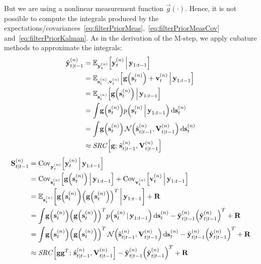 		But we are using a nonlinear measurement function \( \vec{g}(\cdot) \). Hence, it is not possible to compute the integrals produced by the expectations/covariances~\eqref{eq:filterPriorMeas},~\eqref{eq:filterPriorMeasCov} and~\eqref{eq:filterPriorKalman}. As in the derivation of the M-step, we apply cubature methods to approximate the integrals:
		\begin{align}
			\hat{\boldsymbol{\mathrm{y}}}_{t \vert t - 1}^{(n)}
				&= \mathbb{E}_{\boldsymbol{\mathrm{y}}_t^{(n)}}\Big[\boldsymbol{\mathrm{y}}_t^{(n)} \,\Big\vert\, \boldsymbol{\mathrm{y}}_{1:t - 1}\Big]  \nonumber \\
				&= \mathbb{E}_{\boldsymbol{\mathrm{s}}_t^{(n)}, \boldsymbol{\mathrm{v}}_t^{(n)}}\Big[\boldsymbol{\mathrm{g}}\Big(\boldsymbol{\mathrm{s}}_t^{(n)}\Big) + \boldsymbol{\mathrm{v}}_t^{(n)} \,\Big\vert\, \boldsymbol{\mathrm{y}}_{1:t - 1}\Big]  \nonumber \\
				&= \mathbb{E}_{\boldsymbol{\mathrm{s}}_t^{(n)}}\Big[\boldsymbol{\mathrm{g}}\Big(\boldsymbol{\mathrm{s}}_t^{(n)}\Big) \,\Big\vert\, \boldsymbol{\mathrm{y}}_{1:t - 1}\Big]  \nonumber \\
				&= \int\! \boldsymbol{\mathrm{g}}\Big(\boldsymbol{\mathrm{s}}_t^{(n)}\Big) p\Big(\boldsymbol{\mathrm{s}}_t^{(n)} \,\Big\vert\, \boldsymbol{\mathrm{y}}_{1:t - 1}\Big) \dd{\boldsymbol{\mathrm{s}}_t^{(n)}}  \nonumber \\
				&= \int\! \boldsymbol{\mathrm{g}}\Big(\boldsymbol{\mathrm{s}}_t^{(n)}\Big) \,\mathcal{N}\Big(\hat{\boldsymbol{\mathrm{s}}}_{t \vert t - 1}^{(n)}, \boldsymbol{\mathrm{V}}_{t \vert t - 1}^{(n)}\Big) \dd{\boldsymbol{\mathrm{s}}_t^{(n)}}  \nonumber \\
				&\approx \mathit{SRC}\Big[ \boldsymbol{\mathrm{g}};\, \hat{\boldsymbol{\mathrm{s}}}_{t \vert t - 1}^{(n)}, \boldsymbol{\mathrm{V}}_{t \vert t - 1}^{(n)} \Big]  \label{eq:cubatureY}
		\end{align}
		\begin{align}
			\boldsymbol{\mathrm{S}}_{t \vert t - 1}^{(n)}
				&= \operatorname{Cov}_{\boldsymbol{\mathrm{y}}_t^{(n)}}\!\Big[\boldsymbol{\mathrm{y}}_t^{(n)} \,\Big\vert\, \boldsymbol{\mathrm{y}}_{1:t - 1}\Big]  \nonumber \\
				&= \operatorname{Cov}_{\boldsymbol{\mathrm{s}}_t^{(n)}}\!\Big[\boldsymbol{\mathrm{g}}\Big(\boldsymbol{\mathrm{s}}_t^{(n)}\Big) \,\Big\vert\, \boldsymbol{\mathrm{y}}_{1:t - 1}\Big] + \operatorname{Cov}_{\boldsymbol{\mathrm{v}}_t^{(n)}}\!\Big[\boldsymbol{\mathrm{v}}_t^{(n)} \,\Big\vert\, \boldsymbol{\mathrm{y}}_{1:t - 1}\Big]  \nonumber \\
				&= \mathbb{E}_{\boldsymbol{\mathrm{s}}_t^{(n)}}\bigg[\boldsymbol{\mathrm{g}}\Big(\boldsymbol{\mathrm{s}}_t^{(n)}\bigg) \Big(\boldsymbol{\mathrm{g}}\Big(\boldsymbol{\mathrm{s}}_t^{(n)}\Big)\Big)^T \,\bigg\vert\, \boldsymbol{\mathrm{y}}_{1:t - 1}\bigg] + \boldsymbol{\mathrm{R}}  \nonumber \\
				&= \int\! \boldsymbol{\mathrm{g}}\Big(\boldsymbol{\mathrm{s}}_t^{(n)}\Big) \Big(\boldsymbol{\mathrm{g}}\Big(\boldsymbol{\mathrm{s}}_t^{(n)}\Big)\Big)^T p\Big(\boldsymbol{\mathrm{s}}_t^{(n)} \,\vert\, \boldsymbol{\mathrm{y}}_{1:t - 1}\Big) \dd{\boldsymbol{\mathrm{s}}_t^{(n)}} - \hat{\boldsymbol{\mathrm{y}}}_{t \vert t - 1}^{(n)} \Big( \hat{\boldsymbol{\mathrm{y}}}_{t \vert t - 1}^{(n)} \Big)^T + \boldsymbol{\mathrm{R}}  \nonumber \\
				&= \int\! \boldsymbol{\mathrm{g}}\Big(\boldsymbol{\mathrm{s}}_t^{(n)}\Big) \Big(\boldsymbol{\mathrm{g}}\Big(\boldsymbol{\mathrm{s}}_t^{(n)}\Big)\Big)^T \,\mathcal{N}\Big(\hat{\boldsymbol{\mathrm{s}}}_{t \vert t - 1}^{(n)}, \boldsymbol{\mathrm{V}}_{t \vert t - 1}^{(n)}\Big) \dd{\boldsymbol{\mathrm{s}}_t^{(n)}} - \hat{\boldsymbol{\mathrm{y}}}_{t \vert t - 1}^{(n)} \Big( \hat{\boldsymbol{\mathrm{y}}}_{t \vert t - 1}^{(n)} \Big)^T + \boldsymbol{\mathrm{R}}  \nonumber \\
				&\approx \mathit{SRC}\Big[ \boldsymbol{\mathrm{g}} \boldsymbol{\mathrm{g}}^T;\, \hat{\boldsymbol{\mathrm{s}}}_{t \vert t - 1}^{(n)}, \boldsymbol{\mathrm{V}}_{t \vert t - 1}^{(n)} \Big] - \hat{\boldsymbol{\mathrm{y}}}_{t \vert t - 1}^{(n)} \Big( \hat{\boldsymbol{\mathrm{y}}}_{t \vert t - 1}^{(n)} \Big)^T + \boldsymbol{\mathrm{R}}  \label{eq:cubatureS}
		\end{align}
